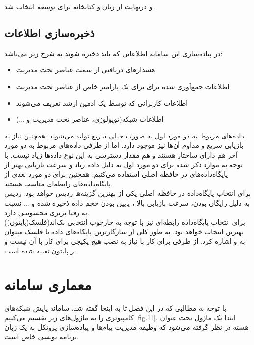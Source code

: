 و درنهایت از زبان  و کتابخانه  برای توسعه انتخاب شد.


\subsection{ذخیره‌سازی اطلاعات}

در پیاده‌سازی این سامانه اطلاعاتی که باید ذخیره شوند به شرح زیر می‌باشد:
\begin{itemize}
    \item هشدارهای دریافتی از سمت عناصر تحت مدیریت
    \item اطلاعات جمع‌آوری شده برای برای یک پارامتر خاص از عناصر تحت مدیریت
    \item اطلاعات کاربرانی که توسط یک ادمین ارشد تعریف می‌شوند
    \item اطلاعات شبکه‌(توپولوژی، عناصر تحت مدیریت و ...)

\end{itemize}

داده‌های مربوط به دو مورد اول به صورت خیلی سریع تولید می‌شوند. همچنین نیاز به بازیابی سریع و مداوم آن‌ها نیز موجود دارد. اما از طرفی داده‌های مربوط به دو مورد آخر هم دارای ساختار هستند و هم مقدار دسترسی به این نوع داده‌ها زیاد نیست. با توجه به موارد ذکر شده برای دو مورد اول به دلیل داده زیاد و سرعت بازیابی بهتر از پایگاه‌داده‌های در حافظه اصلی استفاده می‌کنیم. همچنین برای دو مورد بعدی از پایگاه‌داده‌های رابطه‌ای مناسب هستند.
\\
برای انتخاب پایگاه‌داده‌ در حافظه اصلی یکی از بهترین گزینه‌ها ردیس خواهد بود. ردیس به دلیل رایگان بودن، سرعت بازیابی بالا ، پایین بودن حجم داده ذخیره شده و ... نسبت به رقبا برتری محسوسی دارد.
\\
برای انتخاب پایگاه‌داده رابطه‌ای نیز با توجه به چارچوب انتخابی بک‌اند(فلسک(پایتون))  بهترین انتخاب خواهد بود. به طور کلی از سازگارترین پایگاه‌های داده با فلسک میتوان به  و  اشاره کرد. از طرفی برای کار با  نیاز به نصب هیچ پکیجی برای کار با آن نیست و در پایتون تعبیه شده است.



\newpage

\section{معماری سامانه}




با توجه به مطالبی که در این فصل تا به اینجا گفته شد، سامانه پایش شبکه‌های کامپیوتری را به ماژول‌های زیر تقسیم می‌کنیم \cref{fig.11}. ابتدا یک ماژول تحت عنوان هسته  در نظر گرفته می‌شود که وظیفه مدیریت پیام‌ها و پیاده‌سازی پروتکل به یک زبان برنامه نویسی خاص است.




